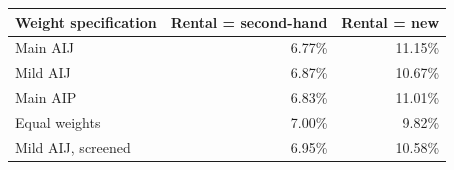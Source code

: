 \begin{tabularx}{\linewidth}{@{}Xrr@{}}
\toprule
Weight specification & Rental = second-hand & Rental = new\\
\midrule
Main AIJ & 6.77\% & 11.15\%\\
Mild AIJ & 6.87\% & 10.67\%\\
Main AIP & 6.83\% & 11.01\%\\
Equal weights & 7.00\% & 9.82\%\\
Mild AIJ, screened & 6.95\% & 10.58\%\\
\bottomrule
\end{tabularx}
